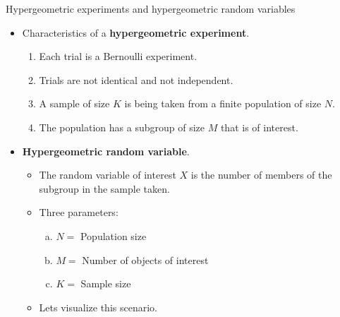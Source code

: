 \documentclass{article}
\begin{document}
\newpage%

Hypergeometric experiments and hypergeometric random variables\bigskip
\begin{itemize}
    \item Characteristics of a \textbf{hypergeometric experiment}.\smallskip
    \begin{enumerate}
        \item Each trial is a Bernoulli experiment.
        \item Trials are not identical and not independent.
        \item A sample of size $K$ is being taken from a finite population of size $N$.
        \item The population has a subgroup of size $M$ that is of interest.\bigskip
    \end{enumerate}
    \item \textbf{Hypergeometric random variable}.\smallskip
    \begin{itemize}
        \item The random variable of interest $X$ is the number of members of the subgroup in the sample taken.\bigskip
        \item Three parameters:
        \begin{enumerate}[(a)]
             \item $N =$ Population size
             \item $M =$ Number of objects of interest
             \item $K = $ Sample size
        \end{enumerate}\smallskip
        \item Lets visualize this scenario.
    \end{itemize}
\end{itemize}\bigskip
\end{document}
